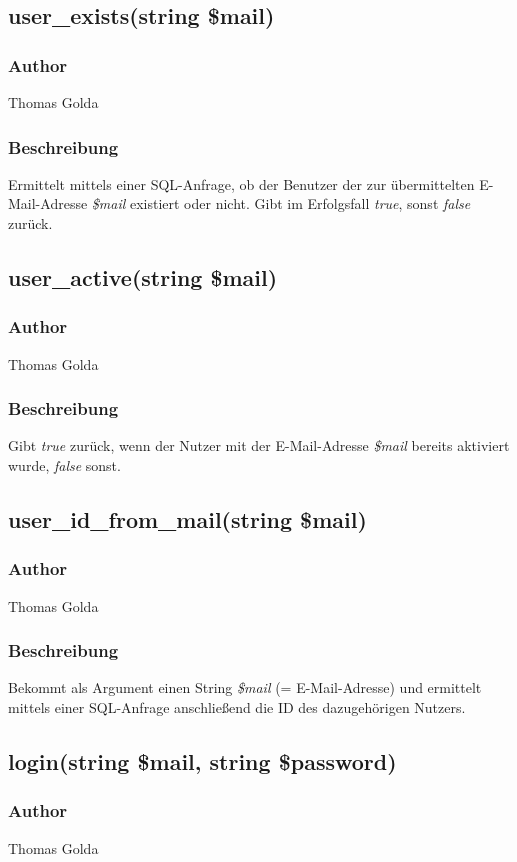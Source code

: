 \documentclass[fontsize = 12pt, paper = a4]{scrreprt}
\begin{document}
\subsection*{user\_exists(string \$mail)}
\subsubsection*{Author}
Thomas Golda
\subsubsection*{Beschreibung}
Ermittelt mittels einer SQL-Anfrage, ob der Benutzer der zur übermittelten E-Mail-Adresse \textit{\$mail} existiert oder nicht. Gibt im Erfolgsfall \textit{true}, sonst \textit{false} zurück.


\subsection*{user\_active(string \$mail)}
\subsubsection*{Author}
Thomas Golda
\subsubsection*{Beschreibung}
Gibt \textit{true} zurück, wenn der Nutzer mit der E-Mail-Adresse \textit{\$mail} bereits aktiviert wurde, \textit{false} sonst.


\subsection*{user\_id\_from\_mail(string \$mail)}
\subsubsection*{Author}
Thomas Golda
\subsubsection*{Beschreibung}
Bekommt als Argument einen String \textit{\$mail} (= E-Mail-Adresse) und ermittelt mittels einer SQL-Anfrage anschließend die ID des dazugehörigen Nutzers.


\subsection*{login(string \$mail, string \$password)}
\subsubsection*{Author}
Thomas Golda
\end{document}
